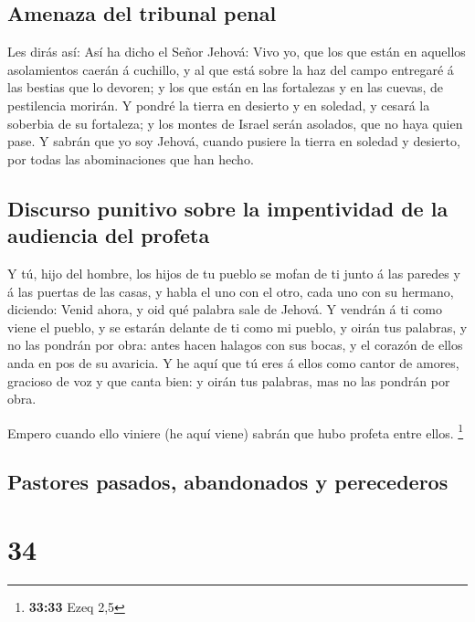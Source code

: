 \hypertarget{amenaza-del-tribunal-penal}{%
\subsection{Amenaza del tribunal
penal}\label{amenaza-del-tribunal-penal}}

 Les dirás así: Así ha dicho el Señor Jehová: Vivo yo, que
los que están en aquellos asolamientos caerán á cuchillo, y al que está
sobre la haz del campo entregaré á las bestias que lo devoren; y los que
están en las fortalezas y en las cuevas, de pestilencia morirán.
 Y pondré la tierra en desierto y en soledad, y cesará la
soberbia de su fortaleza; y los montes de Israel serán asolados, que no
haya quien pase.  Y sabrán que yo soy Jehová, cuando
pusiere la tierra en soledad y desierto, por todas las abominaciones que
han hecho.

\hypertarget{discurso-punitivo-sobre-la-impentividad-de-la-audiencia-del-profeta}{%
\subsection{Discurso punitivo sobre la impentividad de la audiencia del
profeta}\label{discurso-punitivo-sobre-la-impentividad-de-la-audiencia-del-profeta}}

 Y tú, hijo del hombre, los hijos de tu pueblo se mofan de
ti junto á las paredes y á las puertas de las casas, y habla el uno con
el otro, cada uno con su hermano, diciendo: Venid ahora, y oid qué
palabra sale de Jehová.  Y vendrán á ti como viene el
pueblo, y se estarán delante de ti como mi pueblo, y oirán tus palabras,
y no las pondrán por obra: antes hacen halagos con sus bocas, y el
corazón de ellos anda en pos de su avaricia.  Y he aquí que
tú eres á ellos como cantor de amores, gracioso de voz y que canta bien:
y oirán tus palabras, mas no las pondrán por obra.

 Empero cuando ello viniere (he aquí viene) sabrán que hubo
profeta entre ellos. \footnote{\textbf{33:33} Ezeq 2,5}

\hypertarget{pastores-pasados-abandonados-y-perecederos}{%
\subsection{Pastores pasados, abandonados y
perecederos}\label{pastores-pasados-abandonados-y-perecederos}}

\hypertarget{section-33}{%
\section{34}\label{section-33}}

